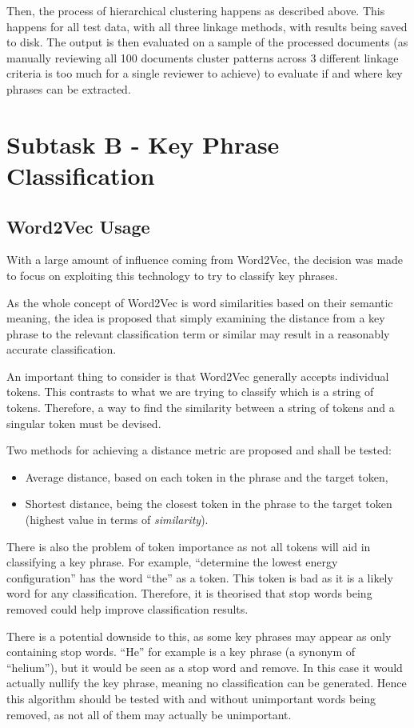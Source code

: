 Then, the process of hierarchical clustering happens as described above. This happens for all test data, with all three linkage methods, with results being saved to disk. The output is then evaluated on a sample of the processed documents (as manually reviewing all 100 documents cluster patterns across 3 different linkage criteria is too much for a single reviewer to achieve) to evaluate if and where key phrases can be extracted.

\section{Subtask B - Key Phrase Classification}
\subsection{Word2Vec Usage}
With a large amount of influence coming from Word2Vec, the decision was made to focus on exploiting this technology to try to classify key phrases.

As the whole concept of Word2Vec is word similarities based on their semantic meaning, the idea is proposed that simply examining the distance from a key phrase to the relevant classification term or similar may result in a reasonably accurate classification. 

An important thing to consider is that Word2Vec generally accepts individual tokens. This contrasts to what we are trying to classify which is a string of tokens. Therefore, a way to find the similarity between a string of tokens and a singular token must be devised.

Two methods for achieving a distance metric are proposed and shall be tested:
\begin{itemize}
	\item Average distance, based on each token in the phrase and the target token,
	\item Shortest distance, being the closest token in the phrase to the target token (highest value in terms of \textit{similarity}).
\end{itemize}

There is also the problem of token importance as not all tokens will aid in classifying a key phrase. For example, ``determine the lowest energy configuration'' has the word ``the'' as a token. This token is bad as it is a likely word for any classification. Therefore, it is theorised that stop words being removed could help improve classification results.

There is a potential downside to this, as some key phrases may appear as only containing stop words. ``He'' for example is a key phrase (a synonym of ``helium''), but it would be seen as a stop word and remove. In this case it would actually nullify the key phrase, meaning no classification can be generated. Hence this algorithm should be tested with and without unimportant words being removed, as not all of them may actually be unimportant.

